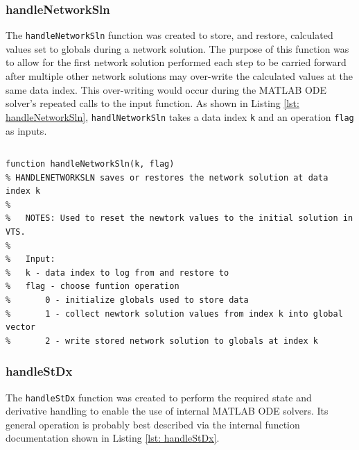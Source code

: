 \subsubsection{handleNetworkSln}  
The \verb|handleNetworkSln| function was created to store, and restore, calculated values set to globals during a network solution.
The purpose of this function was to allow for the first network solution performed each step to be carried forward after multiple other network solutions may over-write the calculated values at the same data index.
This over-writing would occur during the MATLAB ODE solver's repeated calls to the input function.
As shown in Listing \ref{lst: handleNetworkSln}, \verb|handlNetworkSln| takes a data index \verb|k| and an operation \verb|flag| as inputs.

\begin{lstlisting}[caption={Function Header for handleNetworkSln},label={lst: handleNetworkSln}]
\end{lstlisting}\vspace{-2 em}
\begin{verbatim}
function handleNetworkSln(k, flag)
% HANDLENETWORKSLN saves or restores the network solution at data index k
%
%   NOTES: Used to reset the newtork values to the initial solution in VTS.
%
%   Input:
%   k - data index to log from and restore to
%   flag - choose funtion operation
%       0 - initialize globals used to store data
%       1 - collect newtork solution values from index k into global vector
%       2 - write stored network solution to globals at index k
\end{verbatim}

\pagebreak
\subsubsection{handleStDx}  
The \verb|handleStDx| function was created to perform the required state and derivative handling to enable the use of internal MATLAB ODE solvers.
Its general operation is probably best described via the internal function documentation shown in Listing \ref{lst: handleStDx}.

